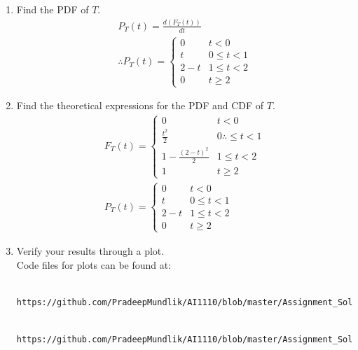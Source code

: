 \documentclass[journal,12pt,twocolumn]{IEEEtran}
\renewcommand\thesection{\arabic{section}}
\begin{document}
\begin{enumerate}[label=\thesection.\arabic*
,ref=\thesection.\theenumi]
\item Find the PDF of $T$. \\
\solution 
\begin{align}
	P_T(t) = \frac{d(F_T(t))}{dt} \\
	\therefore P_T(t) = 
	\begin{cases}
		0 & t < 0 \\
		t &  0 \leq t < 1 \\
		2-t & 1 \leq t < 2 \\
		0  & t \geq 2
	\end{cases}
\end{align}
\item Find the theoretical expressions for the PDF and CDF of $T$. \\
\solution 
\begin{align}
	F_T(t) =  
	 \begin{cases}
		0 & t<0 \\
		\frac{t^2}{2} & 0 \therefore \leq t < 1 \\
		1 - \frac{(2-t)^2}{2} & 1 \leq t < 2 \\
		1 & t \geq 2
	 \end{cases} \\
	 P_T(t) = 
	 \begin{cases}
		 0 & t < 0 \\
		 t &  0 \leq t < 1 \\
		 2-t & 1 \leq t < 2 \\
		 0  & t \geq 2
	 \end{cases}
\end{align}
\item Verify your results through a plot. \\
\solution 
Code files for plots can be found at:
\begin{lstlisting}
	https://github.com/PradeepMundlik/AI1110/blob/master/Assignment_Soln/codes/4/T_pdf.py
\end{lstlisting}
\begin{lstlisting}
	https://github.com/PradeepMundlik/AI1110/blob/master/Assignment_Soln/codes/4/T_cdf.py
\end{lstlisting}
\begin{figure}[h]
	\centering

\end{figure}
\end{enumerate}
\end{document}
